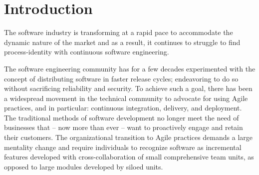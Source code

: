 \documentclass[12pt,a4paper]{article}
\begin{document}

\tableofcontents
\newpage

\section{Introduction}
The software industry is transforming at a rapid pace to accommodate the dynamic nature of the market and as a result, it continues to struggle to find process-identity with continuous software engineering.

The software engineering community has for a few decades experimented with the concept of distributing software in faster release cycles; endeavoring to do so without sacrificing reliability and security. To achieve such a goal, there has been a widespread movement in the technical community to advocate for using Agile practices, and in particular: continuous integration, delivery, and deployment. The traditional methods of software development no longer meet the need of businesses that -- now more than ever -- want to proactively engage and retain their customers. The organizational transition to Agile practices demands a large mentality change and require individuals to recognize software as incremental features developed with cross-collaboration of small comprehensive team units, as opposed to large modules developed by siloed units.
\end{document}

